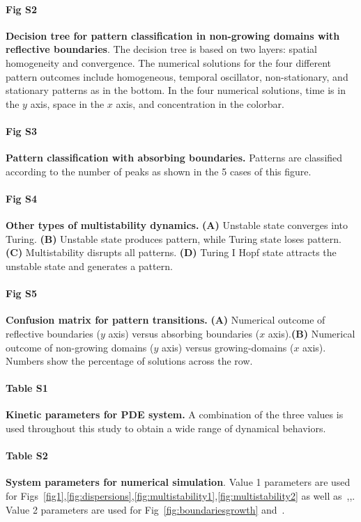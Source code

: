 \documentclass[10pt,letterpaper]{article}
\begin{document}
    
\paragraph*{Fig S2}
\label{sup_fig2}
{\bf Decision tree for pattern classification in non-growing domains with reflective boundaries}. The decision tree is based on two layers: spatial homogeneity and convergence. The numerical solutions for the four different pattern outcomes include homogeneous, temporal oscillator, non-stationary, and stationary patterns as in the bottom. In the four numerical solutions, time is in the $y$ axis, space in the $x$ axis, and concentration in the colorbar.

\paragraph*{Fig S3}
\label{sup_fig3}
{\bf Pattern classification with absorbing boundaries.} Patterns are classified according to the number of peaks as shown in the 5 cases of this figure. 


\paragraph*{Fig S4}
\label{sup_fig4}
{\bf Other types of multistability dynamics.} \textbf{(A)} Unstable state converges into Turing. \textbf{(B)} Unstable state produces pattern, while Turing state loses pattern. \textbf{(C)} Multistability disrupts all patterns. \textbf{(D)} Turing I Hopf state attracts the unstable state and generates a pattern.


\paragraph*{Fig S5}
\label{sup_fig5}
{\bf Confusion matrix for pattern transitions.} \textbf{(A)} Numerical outcome of reflective boundaries ($y$ axis) versus absorbing boundaries ($x$ axis).\textbf{(B)} Numerical outcome of non-growing domains ($y$ axis) versus growing-domains ($x$ axis). Numbers show the percentage of solutions across the row.

\paragraph*{Table S1}
\label{tab:sup_table1}
\textbf{Kinetic parameters for PDE system.} A combination of the three values is used throughout this study to obtain a wide range of dynamical behaviors.

\paragraph*{Table S2}
\label{tab:sup_table2}
\textbf{System parameters for numerical simulation}. Value 1 parameters are used for Figs~\ref{fig1},\ref{fig:dispersions},\ref{fig:multistability1},\ref{fig:multistability2} as well as~,,. Value 2 parameters are used for Fig~\ref{fig:boundariesgrowth} and~.
\end{document}
